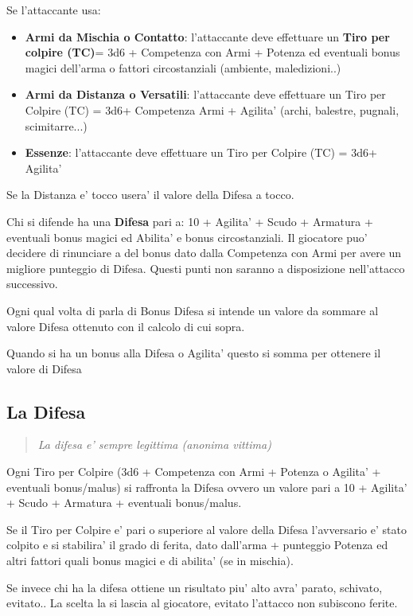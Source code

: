 \documentclass[a4paper,11pt,twoside,openany]{book}
\begin{document}
Se l'attaccante usa:

\begin{itemize}
	\item \textbf{Armi da Mischia o Contatto}: l'attaccante deve effettuare un \textbf{Tiro per colpire (TC)}= 3d6 + Competenza con Armi + Potenza ed eventuali bonus magici dell'arma o fattori circostanziali (ambiente, maledizioni..)
	\item
	\textbf{Armi da Distanza o Versatili}: l'attaccante deve effettuare un Tiro per Colpire (TC) = 3d6+ Competenza Armi + Agilita' (archi, balestre, pugnali, scimitarre...)
	\item	\textbf{Essenze}: l'attaccante deve effettuare un Tiro per Colpire (TC) = 3d6+ Agilita' 
\end{itemize}

Se la Distanza e' tocco usera' il valore della Difesa a tocco.

Chi si difende ha una \textbf{Difesa} pari a: 10 + Agilita' + Scudo + Armatura + eventuali bonus magici ed Abilita' e bonus circostanziali. 
Il giocatore puo' decidere di rinunciare a del bonus dato dalla Competenza con Armi per avere un migliore punteggio di Difesa. Questi punti non saranno a disposizione nell'attacco successivo.

Ogni qual volta di parla di Bonus Difesa si intende un valore da sommare al valore Difesa ottenuto con il calcolo di cui sopra.

Quando si ha un bonus alla Difesa o Agilita' questo si somma per ottenere il valore di Difesa

\subsection{La Difesa}

\label{la-difesa}
\begin{quote}\textit{
		La difesa e' sempre legittima (anonima vittima)
}\end{quote}
Ogni Tiro per Colpire (3d6 + Competenza con Armi + Potenza o Agilita' + eventuali bonus/malus) si raffronta la Difesa ovvero un valore pari a 10 + Agilita' + Scudo + Armatura + eventuali bonus/malus.

Se il Tiro per Colpire e' pari o superiore al valore della Difesa l'avversario e' stato colpito e si stabilira' il grado di ferita, dato dall'arma + punteggio Potenza ed altri fattori quali bonus magici e di abilita' (se in mischia).

Se invece chi ha la difesa ottiene un risultato piu' alto avra' parato, schivato, evitato.. La scelta la si lascia al giocatore, evitato l'attacco non subiscono ferite.
\end{document}
